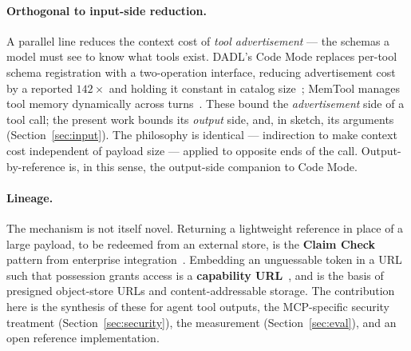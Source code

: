 \documentclass[11pt]{article}
\begin{document}
\paragraph{Orthogonal to input-side reduction.} A parallel line reduces the context cost of \emph{tool advertisement} --- the schemas a model must see to know what tools exist. DADL's Code Mode replaces per-tool schema registration with a two-operation interface, reducing advertisement cost by a reported $142\times$ and holding it constant in catalog size~\citep{dadl}; MemTool manages tool memory dynamically across turns~\citep{memtool}. These bound the \emph{advertisement} side of a tool call; the present work bounds its \emph{output} side, and, in sketch, its arguments (Section~\ref{sec:input}). The philosophy is identical --- indirection to make context cost independent of payload size --- applied to opposite ends of the call. Output-by-reference is, in this sense, the output-side companion to Code Mode.

\paragraph{Lineage.} The mechanism is not itself novel. Returning a lightweight reference in place of a large payload, to be redeemed from an external store, is the \textbf{Claim Check} pattern from enterprise integration~\citep{claimcheck}. Embedding an unguessable token in a URL such that possession grants access is a \textbf{capability URL}~\citep{capurls}, and is the basis of presigned object-store URLs and content-addressable storage. The contribution here is the synthesis of these for agent tool outputs, the MCP-specific security treatment (Section~\ref{sec:security}), the measurement (Section~\ref{sec:eval}), and an open reference implementation.
\end{document}
